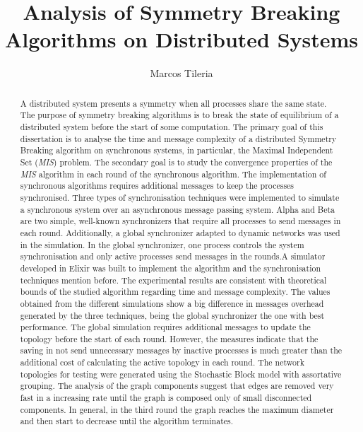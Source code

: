 \documentclass[11pt]{article} %
\title{Analysis of Symmetry Breaking Algorithms on Distributed Systems}
\author{Marcos Tileria}
\theoremstyle{plain}
\theoremstyle{definition}
\begin{document}
\maketitle

\declaration

\begin{abstract}

A distributed system presents a symmetry when all processes share the same state. The purpose of symmetry breaking algorithms is to break the state of equilibrium of a distributed system before the start of some computation. The primary goal of this dissertation is to analyse the time and message complexity of a distributed Symmetry Breaking algorithm on synchronous systems, in particular, the Maximal Independent Set (\textit{MIS}) problem. The secondary goal is to study the convergence properties of the \textit{MIS} algorithm in each round of the synchronous algorithm. The implementation of synchronous algorithms requires additional messages to keep the processes synchronised. Three types of synchronisation techniques were implemented to simulate a synchronous system over an asynchronous message passing system. Alpha and Beta are two simple, well-known synchronizers that require all processes to send messages in each round. Additionally, a global synchronizer adapted to dynamic networks was used in the simulation. In the global synchronizer, one process controls the system synchronisation and only active processes send messages in the rounds.A simulator developed in Elixir was built to implement the algorithm and the synchronisation techniques mention before. The experimental results are consistent with theoretical bounds of the studied algorithm regarding time and message complexity. The values obtained from the different simulations show a big difference in messages overhead generated by the three techniques, being the global synchronizer the one with best performance. The global simulation requires additional messages to update the topology before the start of each round. However, the measures indicate that the saving in not send unnecessary messages by inactive processes is much greater than the additional cost of calculating the active topology in each round. The network topologies for testing were generated using the Stochastic Block model with assortative grouping. The analysis of the graph components suggest that edges are removed very fast in a increasing rate until the graph is composed only of small disconnected components. In general, in the third round the graph reaches the maximum diameter and then start to decrease until the algorithm terminates.


\end{abstract}




 \newpage




 \newpage


\newpage


 \newpage


 \newpage


 \newpage


 \newpage




\end{document}
